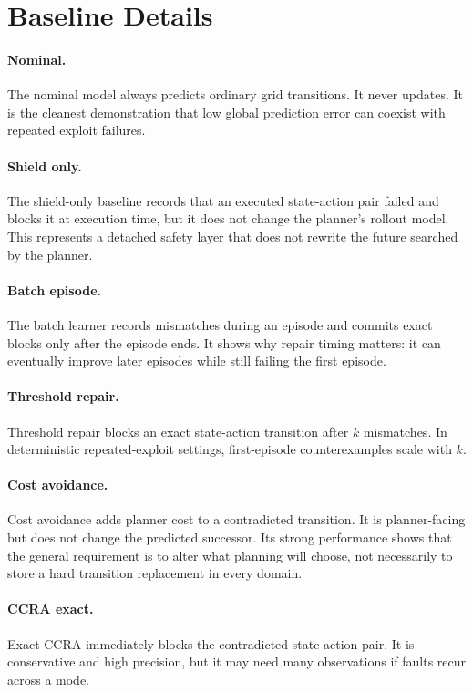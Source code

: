 \documentclass{article}
\begin{document}
\section{Baseline Details}

\paragraph{Nominal.}
The nominal model always predicts ordinary grid transitions. It never updates. It is the cleanest demonstration that low global prediction error can coexist with repeated exploit failures.

\paragraph{Shield only.}
The shield-only baseline records that an executed state-action pair failed and blocks it at execution time, but it does not change the planner's rollout model. This represents a detached safety layer that does not rewrite the future searched by the planner.

\paragraph{Batch episode.}
The batch learner records mismatches during an episode and commits exact blocks only after the episode ends. It shows why repair timing matters: it can eventually improve later episodes while still failing the first episode.

\paragraph{Threshold repair.}
Threshold repair blocks an exact state-action transition after $k$ mismatches. In deterministic repeated-exploit settings, first-episode counterexamples scale with $k$.

\paragraph{Cost avoidance.}
Cost avoidance adds planner cost to a contradicted transition. It is planner-facing but does not change the predicted successor. Its strong performance shows that the general requirement is to alter what planning will choose, not necessarily to store a hard transition replacement in every domain.

\paragraph{CCRA exact.}
Exact CCRA immediately blocks the contradicted state-action pair. It is conservative and high precision, but it may need many observations if faults recur across a mode.
\end{document}
